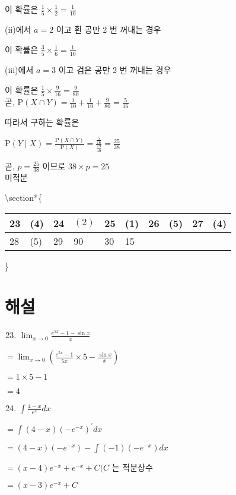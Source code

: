 \documentclass[10pt]{article}
\begin{document}
이 확률은 \(\frac{1}{5} \times \frac{1}{2}=\frac{1}{10}\)

(ii)에서 \(a=2\) 이고 흰 공만 2 번 꺼내는 경우

이 확률은 \(\frac{3}{5} \times \frac{1}{6}=\frac{1}{10}\)

(iii)에서 \(a=3\) 이고 검은 공만 2 번 꺼내는 경우

이 확률은 \(\frac{1}{5} \times \frac{9}{16}=\frac{9}{80}\)\\
곧, \(\mathrm{P}(X \cap Y)=\frac{1}{10}+\frac{1}{10}+\frac{9}{80}=\frac{5}{16}\)

따라서 구하는 확률은

\(\mathrm{P}(Y \mid X)=\frac{\mathrm{P}(X \cap Y)}{\mathrm{P}(X)}=\frac{\frac{5}{16}}{\frac{19}{40}}=\frac{25}{38}\)

곧, \(p=\frac{25}{38}\) 이므로 \(38 \times p=25\)\\
미적분

\textbackslash section*\{\begin{tabular}{|l|l|l|l|l|l|l|l|l|l|}
\hline
23 & (4) & 24 & \((2)\) & 25 & (1) & 26 & (5) & 27 & (4) \\
\hline
28 & (5) & 29 & 90 & 30 & 15 &  &  &  &  \\
\hline
\end{tabular}\}

\section*{해설}
\begin{enumerate}
  \setcounter{enumi}{22}
  \item \(\lim _{x \rightarrow 0} \frac{e^{5 x}-1-\sin x}{x}\)
\end{enumerate}

\(=\lim _{x \rightarrow 0}\left(\frac{e^{5 x}-1}{5 x} \times 5-\frac{\sin x}{x}\right)\)

\(=1 \times 5-1\)

\(=4\)

\begin{enumerate}
  \setcounter{enumi}{23}
  \item \(\int \frac{4-x}{e^{x}} d x\)
\end{enumerate}

\(=\int(4-x)\left(-e^{-x}\right)^{\prime} d x\)

\(=(4-x)\left(-e^{-x}\right)-\int(-1)\left(-e^{-x}\right) d x\)

\(=(x-4) e^{-x}+e^{-x}+C(C\) 는 적분상수

\(=(x-3) e^{-x}+C\)
\end{document}
